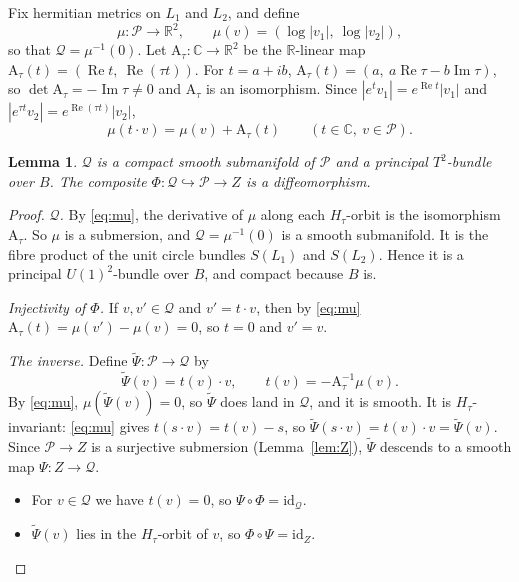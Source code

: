 \documentclass{article}
\newtheorem{lemma}[theorem]{Lemma}
\theoremstyle{definition}
\theoremstyle{plain}
\newcommand{\R}{\mathbb{R}}
\newcommand{\C}{\mathbb{C}}
\DeclareMathOperator{\Ima}{Im}
\DeclareMathOperator{\Rea}{Re}
\begin{document}
Fix hermitian metrics on $L_1$ and $L_2$, and define
\[\mu\colon\mathcal P\to\R^2,\qquad \mu(v)=(\log|v_1|,\ \log|v_2|),\]
so that $\mathcal Q=\mu^{-1}(0)$. Let $\mathrm A_\tau\colon\C\to\R^2$ be the $\R$-linear
map $\mathrm A_\tau(t)=(\Rea t,\ \Rea(\tau t))$. For $t=a+ib$,
$\mathrm A_\tau(t)=(a,\ a\Rea\tau-b\Ima\tau)$, so $\det\mathrm A_\tau=-\Ima\tau\neq0$ and
$\mathrm A_\tau$ is an isomorphism. Since $|e^tv_1|=e^{\Rea t}|v_1|$ and
$|e^{\tau t}v_2|=e^{\Rea(\tau t)}|v_2|$,
\begin{equation}\label{eq:mu}
\mu(t\cdot v)=\mu(v)+\mathrm A_\tau(t)\qquad(t\in\C,\ v\in\mathcal P).
\end{equation}

\begin{lemma}\label{lem:Q}
$\mathcal Q$ is a compact smooth submanifold of $\mathcal P$ and a principal
$T^2$-bundle over $B$. The composite $\Phi\colon\mathcal Q\hookrightarrow\mathcal P\to Z$
is a diffeomorphism.
\end{lemma}
\begin{proof}
\emph{$\mathcal Q$.} By \eqref{eq:mu}, the derivative of $\mu$ along each $H_\tau$-orbit is
the isomorphism $\mathrm A_\tau$. So $\mu$ is a submersion, and $\mathcal Q=\mu^{-1}(0)$ is
a smooth submanifold. It is the fibre product of the unit circle bundles $S(L_1)$ and
$S(L_2)$. Hence it is a principal $U(1)^2$-bundle over $B$, and compact because $B$ is.

\emph{Injectivity of $\Phi$.} If $v,v'\in\mathcal Q$ and $v'=t\cdot v$, then by
\eqref{eq:mu} $\mathrm A_\tau(t)=\mu(v')-\mu(v)=0$, so $t=0$ and $v'=v$.

\emph{The inverse.} Define $\tilde\Psi\colon\mathcal P\to\mathcal Q$ by
\[\tilde\Psi(v)=t(v)\cdot v,\qquad t(v)=-\mathrm A_\tau^{-1}\mu(v).\]
By \eqref{eq:mu}, $\mu(\tilde\Psi(v))=0$, so $\tilde\Psi$ does land in $\mathcal Q$, and
it is smooth. It is $H_\tau$-invariant: \eqref{eq:mu} gives $t(s\cdot v)=t(v)-s$, so
$\tilde\Psi(s\cdot v)=t(v)\cdot v=\tilde\Psi(v)$. Since $\mathcal P\to Z$ is a surjective
submersion (Lemma~\ref{lem:Z}), $\tilde\Psi$ descends to a smooth map $\Psi\colon Z\to\mathcal Q$.
\begin{itemize}
\item For $v\in\mathcal Q$ we have $t(v)=0$, so $\Psi\circ\Phi=\mathrm{id}_{\mathcal Q}$.
\item $\tilde\Psi(v)$ lies in the $H_\tau$-orbit of $v$, so $\Phi\circ\Psi=\mathrm{id}_Z$.
\end{itemize}
\end{proof}
\end{document}
